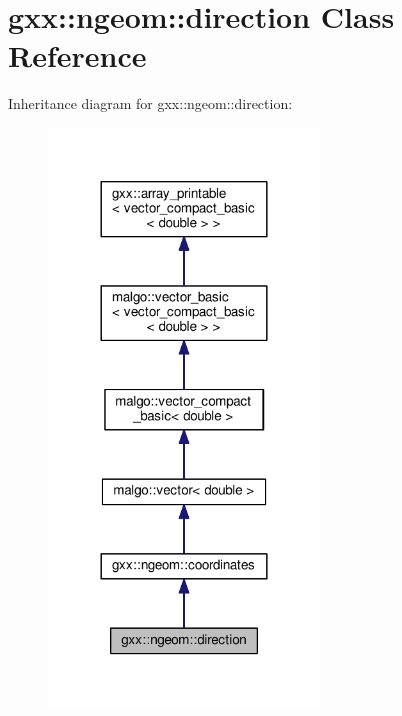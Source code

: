 \hypertarget{classgxx_1_1ngeom_1_1direction}{}\section{gxx\+:\+:ngeom\+:\+:direction Class Reference}
\label{classgxx_1_1ngeom_1_1direction}


Inheritance diagram for gxx\+:\+:ngeom\+:\+:direction\+:
\nopagebreak
\begin{figure}[H]
\begin{center}
\leavevmode
\includegraphics[width=204pt]{classgxx_1_1ngeom_1_1direction__inherit__graph}
\end{center}
\end{figure}


